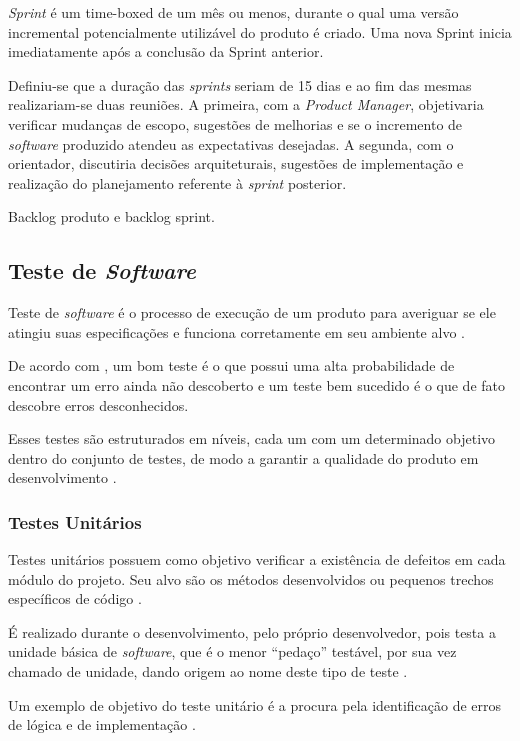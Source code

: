     \textit{Sprint} é um time-boxed de um mês ou menos, durante o qual
    uma versão incremental potencialmente utilizável do produto é criado.
    Uma nova Sprint inicia imediatamente após a conclusão da Sprint anterior.

    Definiu-se que a duração das \textit{sprints} seriam de 15 dias e ao fim das mesmas
    realizariam-se duas reuniões. A primeira, com a \textit{Product Manager}, objetivaria verificar mudanças de escopo, sugestões de melhorias e se o incremento de \textit{software} produzido atendeu as expectativas desejadas. A segunda,
    com o orientador, discutiria decisões arquiteturais, sugestões de implementação e realização
    do planejamento referente à \textit{sprint} posterior.

    Backlog produto e backlog sprint.

    \subsection{Teste de \textit{Software}}
    Teste de \textit{software} é o processo de execução de um produto para averiguar se ele atingiu suas especificações e funciona corretamente em seu ambiente alvo \cite{artigo_intro_teste}.

    De acordo com , um bom teste é o que possui uma alta probabilidade de encontrar um erro ainda não descoberto e um teste bem sucedido é o que de fato descobre erros desconhecidos.

    Esses testes são estruturados em níveis, cada um com um determinado objetivo dentro do conjunto de testes, de modo a garantir a qualidade do produto em desenvolvimento \cite{sw_test_tech}.

        \subsubsection{Testes Unitários}
        Testes unitários possuem como objetivo verificar a existência de defeitos em cada módulo do projeto. Seu alvo são os métodos desenvolvidos ou pequenos trechos específicos de código \cite{artigo_intro_teste}.

        É realizado durante o desenvolvimento, pelo próprio desenvolvedor, pois testa a unidade básica de \textit{software}, que é o menor ``pedaço''  testável, por sua vez chamado de unidade, dando origem ao nome deste tipo de teste \cite{sw_test_tech}.

        Um exemplo de objetivo do teste unitário é a procura pela identificação de erros de lógica e de implementação \cite{maldonado}.

